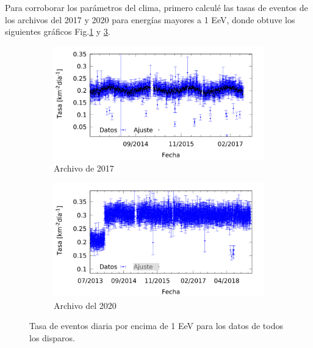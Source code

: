       Para corroborar los parámetros del clima, primero calculé las tasas de eventos de los archivos del 2017 y 2020 para energías mayores a 1  EeV, donde obtuve los siguientes gráficos Fig.\ref{fig:rate_daily_2017_1EeV} y \ref{fig:rate_daily_2020_1EeV}. 

        \begin{figure}[H]
        
          \begin{subfigure}[b]{0.5\textwidth}
          \centering
          \includegraphics[width=\textwidth]{../0_Introduccion/daily_rate/daily_rate_AllTriggers_2017_1EeV.png}
          \caption{Archivo de 2017}   \label{fig:rate_daily_2017_1EeV}
          \end{subfigure}%
        \hfill
          \begin{subfigure}[b]{0.5\textwidth}
          \centering
          \includegraphics[width=\textwidth]{../0_Introduccion/daily_rate/daily_rate_AllTriggers_2019_1EeV.png}
          \caption{Archivo del 2020}  \label{fig:rate_daily_2020_1EeV}
          \end{subfigure}
          \caption{Tasa de eventos diaria por encima de 1 EeV para los datos de todos los disparos.}
        \end{figure}


